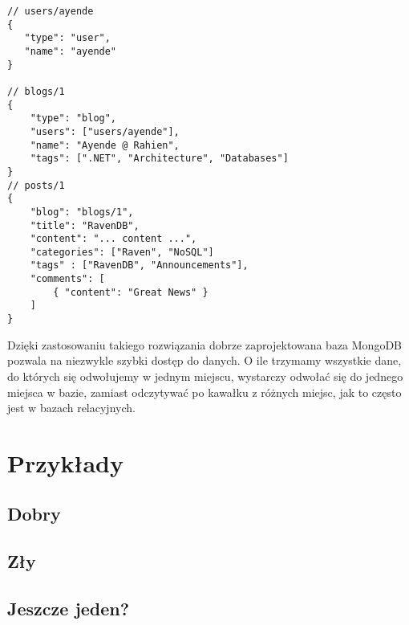 \documentclass[10pt,a4paper]{article}
\begin{document}
\begin{lstlisting}
// users/ayende
{
   "type": "user",
   "name": "ayende"
}

// blogs/1
{
    "type": "blog",
    "users": ["users/ayende"],
    "name": "Ayende @ Rahien",
    "tags": [".NET", "Architecture", "Databases"]
}
// posts/1
{
    "blog": "blogs/1",
    "title": "RavenDB",
    "content": "... content ...",
    "categories": ["Raven", "NoSQL"]
    "tags" : ["RavenDB", "Announcements"],
    "comments": [
        { "content": "Great News" }
    ]
}
\end{lstlisting}

Dzięki zastosowaniu takiego rozwiązania dobrze zaprojektowana baza MongoDB pozwala na niezwykle szybki dostęp do danych. O ile trzymamy wszystkie dane, do których się odwołujemy w jednym miejscu, wystarczy odwołać się do jednego miejsca w bazie, zamiast odczytywać po kawałku z różnych miejsc, jak to często jest w bazach relacyjnych.

\section{Przykłady}
\subsection{Dobry}
\subsection{Zły}
\subsection{Jeszcze jeden?}
\end{document}
